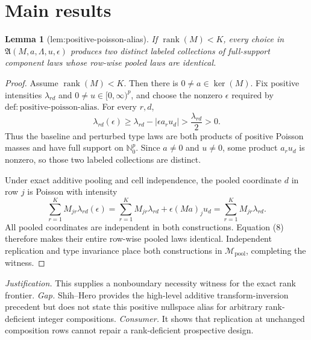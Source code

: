 \documentclass{article}
\newtheorem{lemma}{Lemma}
\begin{document}
\section{Main results}

\begin{lemma}[lem:positive-poisson-alias]\label{lem:positive-poisson-alias}
If \(\operatorname{rank}(M)<K\), every choice in \(\mathfrak A(M,a,\Lambda,u,\epsilon)\) produces two distinct labeled collections of full-support component laws whose row-wise pooled laws are identical.
\end{lemma}
\begin{proof}
Assume \(\operatorname{rank}(M)<K\).  Then there is \(0\ne a\in\ker(M)\).  Fix positive intensities \(\lambda_{rd}\) and \(0\ne u\in[0,\infty)^p\), and choose the nonzero \(\epsilon\) required by \(\mathrm{def{:}positive\text{-}poisson\text{-}alias}\).  For every \(r,d\),
\[
\lambda_{rd}(\epsilon)
\geq\lambda_{rd}-|\epsilon a_ru_d|
>\frac{\lambda_{rd}}2>0. \tag{7}
\]
Thus the baseline and perturbed type laws are both products of positive Poisson masses and have full support on \(\mathbb N_0^p\).  Since \(a\ne0\) and \(u\ne0\), some product \(a_ru_d\) is nonzero, so those two labeled collections are distinct.

Under exact additive pooling and cell independence, the pooled coordinate \(d\) in row \(j\) is Poisson with intensity
\[
\sum_{r=1}^KM_{jr}\lambda_{rd}(\epsilon)
=\sum_{r=1}^KM_{jr}\lambda_{rd}
+\epsilon (Ma)_ju_d
=\sum_{r=1}^KM_{jr}\lambda_{rd}. \tag{8}
\]
All pooled coordinates are independent in both constructions.  Equation (8) therefore makes their entire row-wise pooled laws identical.  Independent replication and type invariance place both constructions in \(\mathcal M_{\mathrm{pool}}\), completing the witness.
\end{proof}
\par\smallskip\noindent \textit{Justification.} This supplies a nonboundary necessity witness for the exact rank frontier. \textit{Gap.} Shih--Hero provides the high-level additive transform-inversion precedent but does not state this positive nullspace alias for arbitrary rank-deficient integer compositions. \textit{Consumer.} It shows that replication at unchanged composition rows cannot repair a rank-deficient prospective design.
\end{document}
